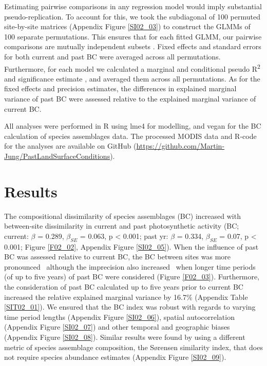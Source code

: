 Estimating pairwise comparisons in any regression model would imply substantial pseudo-replication. To account for this, we took the subdiagonal of 100 permuted site-by-site matrices (Appendix Figure \ref{SI02_03}) to construct the GLMMs of 100 separate permutations. This ensures that for each fitted GLMM, our pairwise comparisons are mutually independent subsets \citep{Longacre2005,Newbold2016b}. Fixed effects and standard errors for both current and past BC were averaged across all permutations. Furthermore, for each model we calculated a marginal and conditional pseudo R\textsuperscript{2} \citep{Nakagawa2013} and significance estimate \cite{Halekoh2014}, and averaged them across all permutations. As for the fixed effects and precision estimates, the differences in explained marginal variance of past BC were assessed relative to the explained marginal variance of current BC.

All analyses were performed in R \citep[ver 3.2.2]{RTeam2014} using lme4 \citep[ver. 1.10]{Bolker2009,lme4} for modelling, and vegan \citep[ver. 2.2.3]{Oksanen2015} for the BC calculation of species assemblages data. The processed MODIS data and R-code for the analyses are available on GitHub (\href{https://github.com/Martin-Jung/PastLandSurfaceConditions}{https://github.com/Martin-Jung/PastLandSurfaceConditions}). 

\section{Results}
\label{C02_03}
The compositional dissimilarity of species assemblages (BC) increased with between-site dissimilarity in current and past photosynthetic activity (BC; current: $\beta$ = 0.289, $\beta_{SE}$ = 0.063, p < 0.001; past yr: $\beta$ = 0.334, $\beta_{SE}$ = 0.07, p < 0.001; Figure \ref{F02_02}, Appendix Figure \ref{SI02_05}). When the influence of past BC was assessed relative to current BC, the BC between sites was more pronounced \textendash\ although the imprecision also increased \textendash\ when longer time periods (of up to five years) of past BC were considered (Figure \ref{F02_03}). Furthermore, the consideration of past BC calculated up to five years prior to current BC increased the relative explained marginal variance by 16.7\% (Appendix Table \ref{SIT02_01}). We ensured that the BC index was robust with regards to varying time period lengths (Appendix Figure \ref{SI02_06}), spatial autocorrelation (Appendix Figure \ref{SI02_07}) and other temporal and geographic biases (Appendix Figure \ref{SI02_08}). Similar results were found by using a different metric of species assemblage composition, the S\o rensen similarity index, that does not require species abundance estimates (Appendix Figure \ref{SI02_09}).

